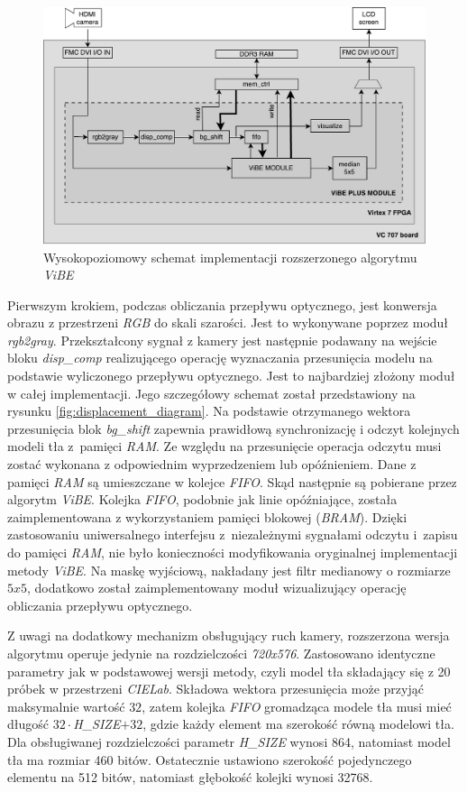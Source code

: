 	\begin{figure}[h!]
		\centering
		\includegraphics[scale=0.6]{img/4/vibe_plus.pdf}
		\caption{Wysokopoziomowy schemat implementacji rozszerzonego algorytmu \textit{ViBE}}
		\label{fig:vibe_plus_diagram}
	\end{figure}

Pierwszym krokiem, podczas obliczania przepływu optycznego, jest konwersja obrazu z przestrzeni \textit{RGB} do skali szarości. 
Jest to wykonywane poprzez moduł \textit{rgb2gray}. 
Przekształcony sygnał z kamery jest następnie podawany na wejście bloku \textit{disp\_comp} realizującego operację wyznaczania przesunięcia modelu na podstawie wyliczonego przepływu optycznego. 
Jest to najbardziej złożony moduł w całej implementacji. 
Jego szczegółowy schemat został przedstawiony na rysunku \ref{fig:displacement_diagram}. 
Na podstawie otrzymanego wektora przesunięcia blok \textit{bg\_shift} zapewnia prawidłową synchronizację i odczyt kolejnych modeli tła z~pamięci \textit{RAM}. 
Ze względu na przesunięcie operacja odczytu musi zostać wykonana z odpowiednim wyprzedzeniem lub opóźnieniem. 
Dane z pamięci \textit{RAM} są umieszczane w kolejce \textit{FIFO}.
Skąd następnie są pobierane przez algorytm \textit{ViBE}. 
Kolejka \textit{FIFO}, podobnie jak linie opóźniające, została zaimplementowana z wykorzystaniem pamięci blokowej (\textit{BRAM}). 
Dzięki zastosowaniu uniwersalnego interfejsu z~niezależnymi sygnałami odczytu i~zapisu do pamięci \textit{RAM}, nie było konieczności modyfikowania oryginalnej implementacji metody \textit{ViBE}. 
Na maskę wyjściową, nakładany jest filtr medianowy o rozmiarze $5x5$, dodatkowo został zaimplementowany moduł wizualizujący operację obliczania przepływu optycznego.

Z uwagi na dodatkowy mechanizm obsługujący ruch kamery, rozszerzona wersja algorytmu operuje jedynie na rozdzielczości \textit{720x576}. 
Zastosowano identyczne parametry jak w podstawowej wersji metody, czyli model tła składający się z 20 próbek w przestrzeni \textit{CIELab}.
Składowa wektora przesunięcia może przyjąć maksymalnie wartość $32$, zatem kolejka \textit{FIFO} gromadząca modele tła musi mieć długość $32 \cdot$\textit{\small{H\_SIZE}}$+32$, gdzie każdy element ma szerokość równą modelowi tła. 
Dla obsługiwanej rozdzielczości parametr \textit{\small{H\_SIZE}} wynosi 864, natomiast model tła ma rozmiar 460 bitów. Ostatecznie ustawiono szerokość pojedynczego elementu na 512 bitów, natomiast głębokość kolejki wynosi 32768.  

